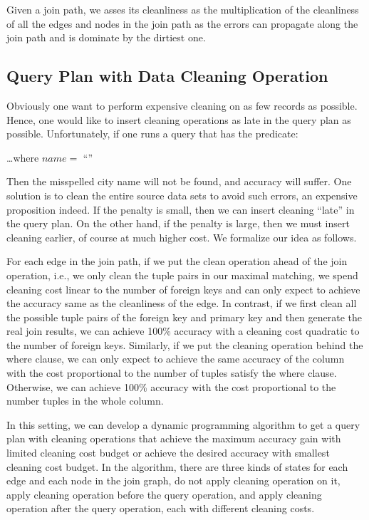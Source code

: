 Given a join path, we asses its cleanliness as the multiplication of the cleanliness of all the edges and nodes in the join path as the errors can propagate along the join path and is dominate by the dirtiest one.



\subsection{Query Plan with Data Cleaning Operation}\label{subsec:gain}

Obviously one want to perform expensive cleaning on as few records as possible. Hence, one would like to insert cleaning operations as late in the query plan as possible. Unfortunately, if one runs a query that has the predicate:

\vspace{.5em}
\dots \textsf{where} $name = $ ``''
\vspace{.5em}

\noindent Then the misspelled city name will not be found, and accuracy will suffer. One solution is to clean the entire source data sets to avoid such errors, an expensive proposition indeed. If the penalty is small, then we can insert cleaning ``late'' in the query plan. On the other hand, if the penalty is large, then we must insert cleaning earlier, of course at much higher cost. We formalize our idea as follows.




For each edge in the join path, if we put the clean operation ahead of the join operation, i.e., we only clean the tuple pairs in our maximal matching, we spend cleaning cost linear to the number of foreign keys and can only expect to achieve the accuracy same as the cleanliness of the edge. In contrast, if we first clean all the possible tuple pairs of the foreign key and primary key and then generate the real join results, we can achieve 100\% accuracy with a cleaning cost quadratic to the number of foreign keys. Similarly, if we put the cleaning operation behind the where clause, we can only expect to achieve the same accuracy of the column with the cost proportional to the number of tuples satisfy the where clause. Otherwise, we can achieve 100\% accuracy with the cost proportional to the number tuples in the whole column.




In this setting, we can develop a dynamic programming algorithm to get a query plan with cleaning operations that achieve the maximum accuracy gain with limited cleaning cost budget or achieve the desired accuracy with smallest cleaning cost budget. In the algorithm, there are three kinds of states for each edge and each node in the join graph, do not apply cleaning operation on it, apply cleaning operation before the query operation, and apply cleaning operation after the query operation, each with different cleaning costs. 


